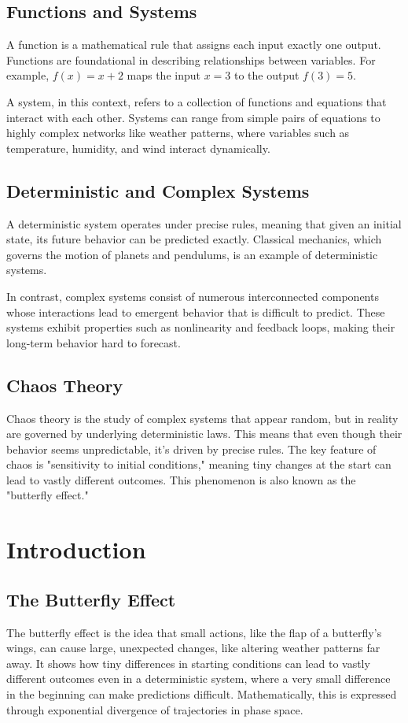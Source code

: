 \documentclass[12pt]{article}
\begin{document}
\subsection{Functions and Systems}
A function is a mathematical rule that assigns each input exactly one output. Functions are foundational in describing relationships between variables. For example, \( f(x) = x + 2 \) maps the input \( x = 3 \) to the output \( f(3) = 5 \).

A system, in this context, refers to a collection of functions and equations that interact with each other. Systems can range from simple pairs of equations to highly complex networks like weather patterns, where variables such as temperature, humidity, and wind interact dynamically.

\subsection{Deterministic and Complex Systems}
A deterministic system operates under precise rules, meaning that given an initial state, its future behavior can be predicted exactly. Classical mechanics, which governs the motion of planets and pendulums, is an example of deterministic systems.

In contrast, complex systems consist of numerous interconnected components whose interactions lead to emergent behavior that is difficult to predict. These systems exhibit properties such as nonlinearity and feedback loops, making their long-term behavior hard to forecast.

\subsection{Chaos Theory}
Chaos theory is the study of complex systems that appear random, but in reality are governed by underlying deterministic laws. This means that even though their behavior seems unpredictable, it's driven by precise rules. The key feature of chaos is "sensitivity to initial conditions," meaning tiny changes at the start can lead to vastly different outcomes. This phenomenon is also known as the "butterfly effect."

\section{Introduction}

\subsection{The Butterfly Effect}
The butterfly effect is the idea that small actions, like the flap of a butterfly’s wings, can cause large, unexpected changes, like altering weather patterns far away. It shows how tiny differences in starting conditions can lead to vastly different outcomes even in a deterministic system, where a very small difference in the beginning can make predictions difficult. Mathematically, this is expressed through exponential divergence of trajectories in phase space.
\end{document}
